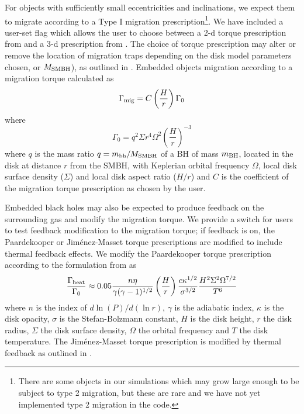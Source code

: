 For objects with sufficiently small eccentricities and inclinations, we expect them to migrate according to a Type I migration prescription\footnote{There are some objects in our simulations which may grow large enough to be subject to type 2 migration, but these are rare and we have not yet implemented type 2 migration in the code.}.
We have included a user-set flag { }which allows the user to choose between a 2-d torque prescription from \citet{Paardekooper+10} and a 3-d prescription from \citet{JimenezMassset17}.
The choice of torque prescription may alter or remove the location of migration traps depending on the disk model parameters chosen, or $M_{\rm SMBH}$), as outlined in \citet{Grishin+23}.
Embedded objects migration according to a migration torque calculated as 
\begin{equation}
 \Gamma_{\rm mig} = C \left(\frac{H}{r} \right) \Gamma_{0}    
\end{equation}
where 
\begin{equation}
    \Gamma_{0}= q^{2} \Sigma r^{4} \Omega^{2} \left( \frac{H}{r}\right)^{-3}
\end{equation}
where $q$ is the mass ratio $q=m_{\rm bh}/M_{\rm SMBH}$ of a BH of mass $m_{\rm BH}$, located in the disk at distance $r$ from the SMBH, with Keplerian orbital frequency $\Omega$, local disk surface density ($\Sigma$) and local disk aspect ratio ($H/r$) and $C$ is the coefficient of the migration torque prescription as chosen by the user. 

Embedded black holes may also be expected to produce feedback on the surrounding gas and modify the migration torque.
We provide a switch for users {} to test feedback modification to the migration torque; if feedback is on, the Paardekooper or Jim\'enez-Masset torque prescriptions are modified to include thermal feedback effects. We modify the Paardekooper torque prescription according to the formulation from \citet{HanklaJiangArmitage20} as
\begin{equation}
    \frac{\Gamma_{\rm heat}}{\Gamma_{0}} \approx 0.05\frac{n \eta}{\gamma(\gamma -1)^{1/2}}\left(\frac{H}{r}\right)\frac{c \kappa^{1/2}}{\sigma^{3/2}}\frac{H^{2}\Sigma^{2}\Omega^{7/2}}{T^{6}}
\label{eq:heat}
\end{equation}
where $n$ is the index of $d\ln(P)/d(\ln r)$, $\gamma$ is the adiabatic index, $\kappa$ is the disk opacity, $\sigma$ is the Stefan-Bolzmann constant, $H$ is the disk height, $r$ the disk radius, $\Sigma$ the disk surface density, $\Omega$ the orbital frequency and $T$ the disk temperature.
The Jim\'enez-Masset torque prescription is modified by thermal feedback as outlined in \citet{Grishin+23}.


